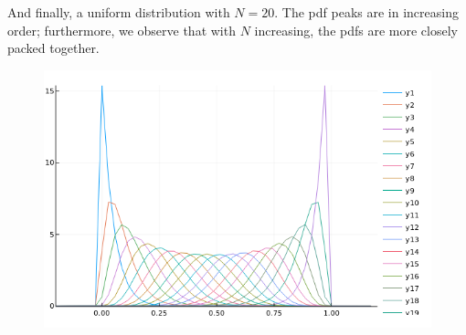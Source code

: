 And finally, a uniform distribution with $N=20$. The pdf peaks are in increasing order; furthermore, we observe that with $N$ increasing, the pdfs are more closely packed together.

\begin{figure}[H]
	\centering
	\includegraphics[scale=0.7]{images/order_stat_2_4.png}
\end{figure}

